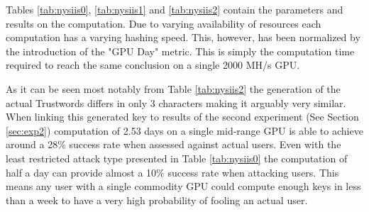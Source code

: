 Tables \ref{tab:nysiis0}, \ref{tab:nysiis1} and \ref{tab:nysiis2} contain the parameters and results on the computation. Due to varying availability of resources each computation has a varying hashing speed. This, however, has been normalized by the introduction of the "GPU Day" metric. This is simply the computation time required to reach the same conclusion on a single 2000 MH/s GPU. 

As it can be seen most notably from Table \ref{tab:nysiis2} the generation of the actual Trustwords differs in only 3 characters making it arguably very similar. When linking this generated key to results of the second experiment (See Section \ref{sec:exp2}) computation of 2.53 days on a single mid-range GPU is able to achieve around a 28\% success rate when assessed against actual users. Even with the least restricted attack type presented in Table \ref{tab:nysiis0} the computation of half a day can provide almost a 10\% success rate when attacking users. This means any user with a single commodity GPU could compute enough keys in less than a week to have a very high probability of fooling an actual user.
